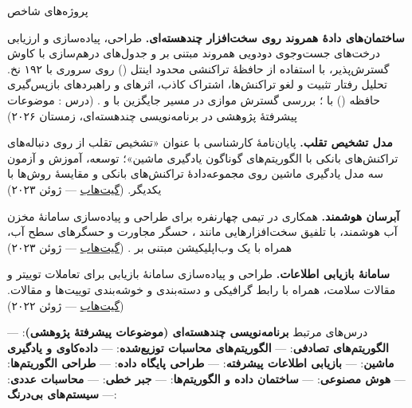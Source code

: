 \documentclass[11pt]{article}
\begin{document}
\begin{faSection}{پروژه‌های شاخص}

\textbf{ساختمان‌های دادۀ همروند روی سخت‌افزار چندهسته‌ای.} طراحی، پیاده‌سازی و ارزیابی درخت‌های جست‌وجوی دودویی همروند مبتنی بر  و جدول‌های درهم‌سازی با کاوش گسترش‌پذیر، با استفاده از حافظۀ تراکنشی محدود اینتل () روی سروری  با ۱۹۲ نخ. تحلیل رفتار تثبیت و لغو تراکنش‌ها، اشتراک کاذب، اثرهای  و راهبردهای بازپس‌گیری حافظه () با ؛ بررسی گسترش موازی در مسیر جایگزین با  و . (درس : موضوعات پیشرفتۀ پژوهشی در برنامه‌نویسی چندهسته‌ای، زمستان ۲۰۲۶)

\vspace{0.4em}
\textbf{مدل تشخیص تقلب.} پایان‌نامۀ کارشناسی با عنوان «تشخیص تقلب از روی دنباله‌های تراکنش‌های بانکی با الگوریتم‌های گوناگون یادگیری ماشین»؛ توسعه، آموزش و آزمون سه مدل یادگیری ماشین روی مجموعه‌دادۀ تراکنش‌های بانکی و مقایسۀ روش‌ها با یکدیگر. (\href{https://github.com/kahbodaeini/Fraud-Detection}{گیت‌هاب} --- ژوئن ۲۰۲۳)

\vspace{0.4em}
\textbf{آبرسان هوشمند.} همکاری در تیمی چهارنفره برای طراحی و پیاده‌سازی سامانۀ مخزن آب هوشمند، با تلفیق سخت‌افزارهایی مانند ، حسگر مجاورت و حسگرهای سطح آب، همراه با یک وب‌اپلیکیشن مبتنی بر . (\href{https://github.com/Parsa2820/es-project}{گیت‌هاب} --- ژوئن ۲۰۲۳)

\vspace{0.4em}
\textbf{سامانۀ بازیابی اطلاعات.} طراحی و پیاده‌سازی سامانۀ بازیابی برای تعاملات توییتر و مقالات سلامت، همراه با رابط گرافیکی و دسته‌بندی و خوشه‌بندی توییت‌ها و مقالات. (\href{https://github.com/IR1401-Spring-Final-Projects/SocialMediaHealth1401-19_39}{گیت‌هاب} --- ژوئن ۲۰۲۲)

\end{faSection}

\begin{faSection}{درس‌های مرتبط}
\textbf{برنامه‌نویسی چندهسته‌ای (موضوعات پیشرفتۀ پژوهشی)}:  --- \textbf{الگوریتم‌های تصادفی}:  --- \textbf{الگوریتم‌های محاسبات توزیع‌شده}:  --- \textbf{داده‌کاوی و یادگیری ماشین}:  --- \textbf{بازیابی اطلاعات پیشرفته}:  --- \textbf{طراحی پایگاه داده}:  --- \textbf{طراحی الگوریتم‌ها}:  --- \textbf{هوش مصنوعی}:  --- \textbf{ساختمان داده و الگوریتم‌ها}:  --- \textbf{جبر خطی}:  --- \textbf{محاسبات عددی}:  --- \textbf{سیستم‌های بی‌درنگ}: 
\end{faSection}
\end{document}

